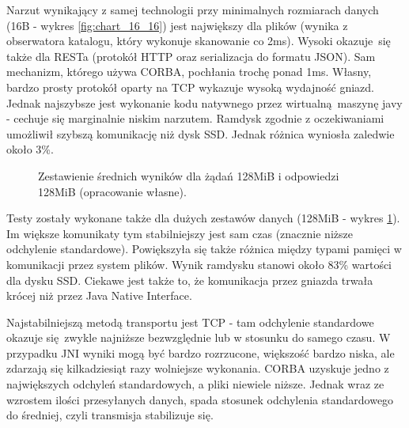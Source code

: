 Narzut wynikający z samej technologii przy minimalnych rozmiarach danych (16B - wykres \ref{fig:chart_16_16}) jest największy dla plików (wynika z obserwatora katalogu, który wykonuje skanowanie co 2ms). Wysoki okazuje się także dla RESTa (protokół HTTP oraz serializacja do formatu JSON). Sam mechanizm, którego używa CORBA, pochłania trochę ponad 1ms. Własny, bardzo prosty protokół oparty na TCP wykazuje wysoką wydajność gniazd.
Jednak najszybsze jest wykonanie kodu natywnego przez wirtualną maszynę javy - cechuje się marginalnie niskim narzutem.
Ramdysk zgodnie z oczekiwaniami umożliwił szybszą komunikację niż dysk SSD. Jednak różnica wyniosła zaledwie około 3\%.
 

\begin{figure}[H]
\caption{Zestawienie średnich wyników dla żądań 128MiB i odpowiedzi 128MiB (opracowanie własne).}
\label{fig:chart_134217728_134217728}
\end{figure}

Testy zostały wykonane także dla dużych zestawów danych (128MiB - wykres \ref{fig:chart_134217728_134217728}). Im większe komunikaty tym stabilniejszy jest sam czas (znacznie niższe odchylenie standardowe).
Powiększyła się także różnica między typami pamięci w komunikacji przez system plików. Wynik ramdysku stanowi około 83\% wartości dla dysku SSD.
Ciekawe jest także to, że komunikacja przez gniazda trwała krócej niż przez Java Native Interface.

Najstabilniejszą metodą transportu jest TCP - tam odchylenie standardowe okazuje się zwykle najniższe bezwzględnie lub w stosunku do samego czasu. W przypadku JNI wyniki mogą być bardzo rozrzucone, większość bardzo niska, ale zdarzają się kilkadziesiąt razy wolniejsze wykonania.
CORBA uzyskuje jedno z największych odchyleń standardowych, a pliki niewiele niższe. Jednak wraz ze wzrostem ilości przesyłanych danych, spada stosunek odchylenia standardowego do średniej, czyli transmisja stabilizuje się.

